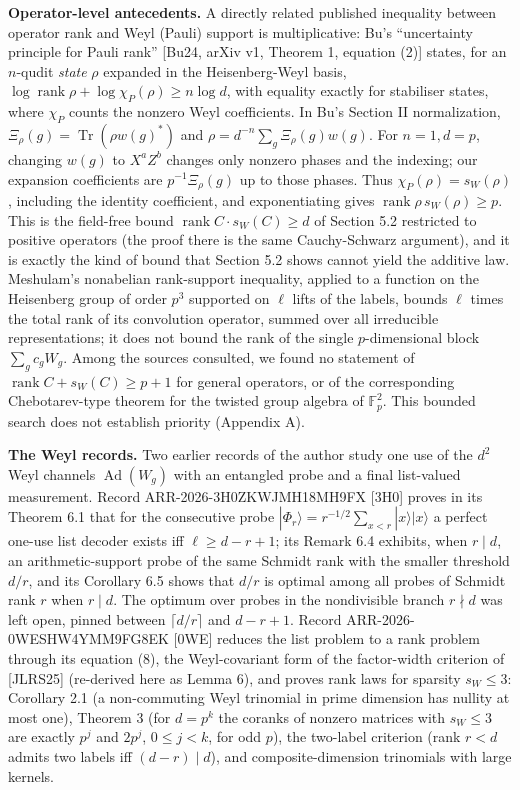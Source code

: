 \documentclass[
  11pt,
  a4paper,
]{article}
\begin{document}
\textbf{Operator-level antecedents.} A directly related published
inequality between operator rank and Weyl (Pauli) support is
multiplicative: Bu's ``uncertainty principle for Pauli rank'' {[}Bu24,
arXiv v1, Theorem 1, equation (2){]} states, for an \(n\)-qudit
\emph{state} \(\rho\) expanded in the Heisenberg-Weyl basis,
\(\log\operatorname{rank}\rho+\log\chi_P(\rho)\ge n\log d\), with
equality exactly for stabiliser states, where \(\chi_P\) counts the
nonzero Weyl coefficients. In Bu's Section II normalization,
\(\Xi_\rho(g)=\operatorname{Tr}(\rho w(g)^*)\) and
\(\rho=d^{-n}\sum_g\Xi_\rho(g)w(g)\). For \(n=1,\allowbreak{}d=p\), changing \(w(g)\)
to \(X^aZ^b\) changes only nonzero phases and the indexing; our
expansion coefficients are \(p^{-1}\Xi_\rho(g)\) up to those phases.
Thus \(\chi_P(\rho)=s_W(\rho)\), including the identity coefficient, and
exponentiating gives \(\operatorname{rank}\rho\,\allowbreak{}s_W(\rho)\ge p\). This
is the field-free bound \(\operatorname{rank}C\cdot s_W(C)\ge d\) of
Section 5.2 restricted to positive operators (the proof there is the
same Cauchy-Schwarz argument), and it is exactly the kind of bound that
Section 5.2 shows cannot yield the additive law. Meshulam's nonabelian
rank-support inequality, applied to a function on the Heisenberg group
of order \(p^3\) supported on \(\ell\) lifts of the labels, bounds
\(\ell\) times the total rank of its convolution operator, summed over
all irreducible representations; it does not bound the rank of the
single \(p\)-dimensional block \(\sum_gc_gW_g\). Among the sources
consulted, we found no statement of
\(\operatorname{rank}C+s_W(C)\ge p+1\) for general operators, or of the
corresponding Chebotarev-type theorem for the twisted group algebra of
\(\mathbb F_p^2\). This bounded search does not establish priority
(Appendix A).

\textbf{The Weyl records.} Two earlier records of the author study one
use of the \(d^2\) Weyl channels \(\operatorname{Ad}(W_g)\) with an
entangled probe and a final list-valued measurement. Record
ARR-2026-3H0ZKWJMH18MH9FX {[}3H0{]} proves in its Theorem 6.1 that for
the consecutive probe
\(|\Phi_r\rangle=r^{-1/2}\sum_{x<r}|x\rangle|x\rangle\) a perfect
one-use list decoder exists iff \(\ell\ge d-r+1\); its Remark 6.4
exhibits, when \(r\mid d\), an arithmetic-support probe of the same
Schmidt rank with the smaller threshold \(d/r\), and its Corollary 6.5
shows that \(d/r\) is optimal among all probes of Schmidt rank \(r\)
when \(r\mid d\). The optimum over probes in the nondivisible branch
\(r\nmid d\) was left open, pinned between \(\lceil d/r\rceil\) and
\(d-r+1\). Record ARR-2026-0WESHW4YMM9FG8EK {[}0WE{]} reduces the list
problem to a rank problem through its equation (8), the Weyl-covariant
form of the factor-width criterion of {[}JLRS25{]} (re-derived here as
Lemma 6), and proves rank laws for sparsity \(s_W\le3\): Corollary 2.1
(a non-commuting Weyl trinomial in prime dimension has nullity at most
one), Theorem 3 (for \(d=p^k\) the coranks of nonzero matrices with
\(s_W\le3\) are exactly \(p^j\) and \(2p^j\), \(0\le j<k\), for odd
\(p\)), the two-label criterion (rank \(r<d\) admits two labels iff
\((d-r)\mid d\)), and composite-dimension trinomials with large kernels.
\end{document}
